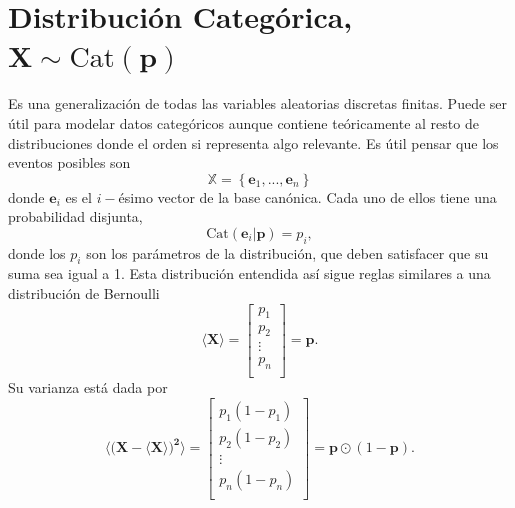 \section{Distribuci\'on Categ\'orica, $\mathbf{X}\sim \text{Cat}(\mathbf{p})$}
Es una generalización de todas las variables aleatorias discretas finitas. Puede ser útil para modelar datos categóricos aunque contiene teóricamente al resto de distribuciones donde el orden si representa algo relevante. Es útil pensar que los eventos posibles son
\begin{equation}
    \mathbb{X} = \left\{
    \mathbf{e}_1,...,\mathbf{e}_n
    \right\}
\end{equation}
donde $\mathbf{e}_i$ es el $i-$\'esimo vector de la base can\'onica. Cada uno de ellos tiene una probabilidad disjunta,
\begin{equation}
    \text{Cat}(\mathbf{e}_i|\mathbf{p}) = p_i,
\end{equation}
donde los $p_i$ son los par\'ametros de la distribuci\'on, que deben satisfacer que su suma sea igual a 1. Esta distribuci\'on entendida as\'i sigue reglas similares a una distribuci\'on de Bernoulli
\begin{equation}
    \langle \mathbf{X}\rangle = 
    \left[
    \begin{array}{c}
         p_1\\
         p_2\\
         \vdots\\
         p_n\\
    \end{array}
    \right]=
    \mathbf{p}.
\end{equation}
Su varianza est\'a dada por
\begin{equation}
    \langle (\mathbf{X-\langle\mathbf{X}\rangle)^2\rangle} =
    \left[
    \begin{array}{c}
         p_1(1-p_1)\\
         p_2(1-p_2)\\
         \vdots\\
         p_n(1-p_n)\\
    \end{array}
    \right]= \mathbf{p}\odot (1-\mathbf{p}).
\end{equation}


